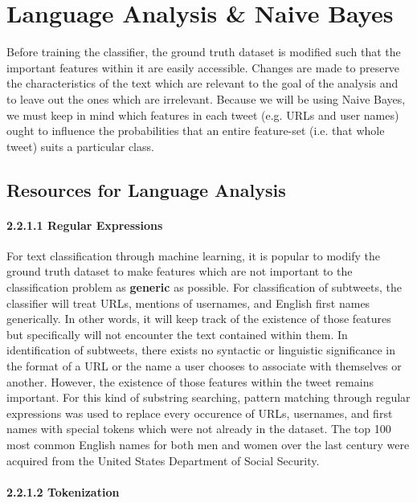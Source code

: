 \documentclass[11pt, twoside, reqno]{book}
\begin{document}
\section{Language Analysis \& Naive Bayes}
\label{language_analysis}

Before training the classifier, the ground truth dataset is modified such that the important features within it are easily accessible. Changes are made to preserve the characteristics of the text which are relevant to the goal of the analysis and to leave out the ones which are irrelevant. Because we will be using Naive Bayes, we must keep in mind which features in each tweet (e.g. URLs and user names) ought to influence the probabilities that an entire feature-set (i.e. that whole tweet) suits a particular class.

\subsection{Resources for Language Analysis}
\label{resource}

\paragraph{2.2.1.1  Regular Expressions}
\label{regular_expressions}

For text classification through machine learning, it is popular to modify the ground truth dataset to make features which are not important to the classification problem as \textbf{generic} as possible. For classification of subtweets, the classifier will treat URLs, mentions of usernames, and English first names generically. In other words, it will keep track of the existence of those features but specifically will not encounter the text contained within them. In identification of subtweets, there exists no syntactic or linguistic significance in the format of a URL or the name a user chooses to associate with themselves or another. However, the existence of those features within the tweet remains important. For this kind of substring searching, pattern matching through regular expressions was used to replace every occurence of URLs, usernames, and first names with special tokens which were not already in the dataset. The top 100 most common English names for both men and women over the last century were acquired from the United States Department of Social Security.

\paragraph{2.2.1.2  Tokenization}
\label{tokenization}
\end{document}
